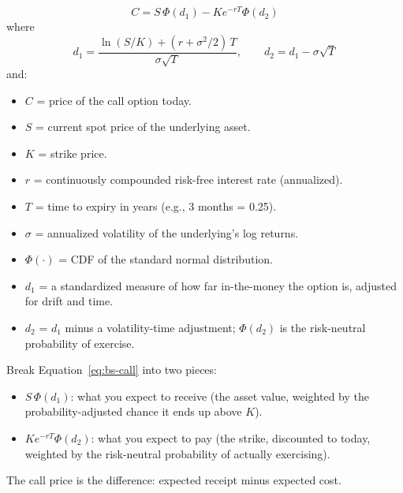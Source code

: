 \begin{definition}
\label{def:bs-formula}
\begin{equation}
  C = S\,\Phi(d_1) - K e^{-rT}\Phi(d_2)
  \label{eq:bs-call}
\end{equation}
where
\begin{equation}
  d_1 = \frac{\ln(S/K) + (r + \sigma^2/2)\,T}{\sigma\sqrt{T}}, \qquad
  d_2 = d_1 - \sigma\sqrt{T}
  \label{eq:bs-d1d2}
\end{equation}
and:
\begin{itemize}[nosep]
  \item $C$ = price of the call option today.
  \item $S$ = current spot price of the underlying asset.
  \item $K$ = strike price.
  \item $r$ = continuously compounded risk-free interest rate (annualized).
  \item $T$ = time to expiry in years (e.g., 3 months = 0.25).
  \item $\sigma$ = annualized volatility of the underlying's log returns.
  \item $\Phi(\cdot)$ = CDF of the standard normal distribution.
  \item $d_1$ = a standardized measure of how far in-the-money the option is, adjusted for drift and time.
  \item $d_2$ = $d_1$ minus a volatility-time adjustment; $\Phi(d_2)$ is the risk-neutral probability of exercise.
\end{itemize}
\end{definition}

\begin{intuition}
Break Equation~\eqref{eq:bs-call} into two pieces:
\begin{itemize}[nosep]
  \item $S\,\Phi(d_1)$: what you expect to receive (the asset value, weighted by the probability-adjusted chance it ends up above $K$).
  \item $K e^{-rT}\Phi(d_2)$: what you expect to pay (the strike, discounted to today, weighted by the risk-neutral probability of actually exercising).
\end{itemize}
The call price is the difference: expected receipt minus expected cost.
\end{intuition}

